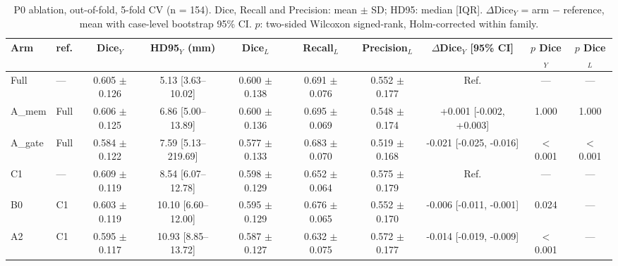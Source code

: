 \begin{table}[t]
\centering\small
\caption{P0 ablation, out-of-fold, 5-fold CV (n = 154). Dice, Recall and Precision: mean $\pm$ SD; HD95: median [IQR]. $\Delta$Dice$_Y$ = arm $-$ reference, mean with case-level bootstrap 95\% CI. $p$: two-sided Wilcoxon signed-rank, Holm-corrected within family.}
\label{tab:p0}
\begin{tabular}{llcccccccc}
\toprule
Arm & ref. & Dice$_Y$ & HD95$_Y$ (mm) & Dice$_L$ & Recall$_L$ & Precision$_L$ & $\Delta$Dice$_Y$ [95\% CI] & $p$ Dice$_Y$ & $p$ Dice$_L$ \\
\midrule
Full & — & 0.605 $\pm$ 0.126 & 5.13 [3.63–10.02] & 0.600 $\pm$ 0.138 & 0.691 $\pm$ 0.076 & 0.552 $\pm$ 0.177 & Ref. & — & — \\
A\_mem & Full & 0.606 $\pm$ 0.125 & 6.86 [5.00–13.89] & 0.600 $\pm$ 0.136 & 0.695 $\pm$ 0.069 & 0.548 $\pm$ 0.174 & +0.001 [-0.002, +0.003] & 1.000 & 1.000 \\
A\_gate & Full & 0.584 $\pm$ 0.122 & 7.59 [5.13–219.69] & 0.577 $\pm$ 0.133 & 0.683 $\pm$ 0.070 & 0.519 $\pm$ 0.168 & -0.021 [-0.025, -0.016] & $<$0.001 & $<$0.001 \\
C1 & — & 0.609 $\pm$ 0.119 & 8.54 [6.07–12.78] & 0.598 $\pm$ 0.129 & 0.652 $\pm$ 0.064 & 0.575 $\pm$ 0.179 & Ref. & — & — \\
B0 & C1 & 0.603 $\pm$ 0.119 & 10.10 [6.60–12.00] & 0.595 $\pm$ 0.129 & 0.676 $\pm$ 0.065 & 0.552 $\pm$ 0.170 & -0.006 [-0.011, -0.001] & 0.024 & — \\
A2 & C1 & 0.595 $\pm$ 0.117 & 10.93 [8.85–13.72] & 0.587 $\pm$ 0.127 & 0.632 $\pm$ 0.075 & 0.572 $\pm$ 0.177 & -0.014 [-0.019, -0.009] & $<$0.001 & — \\
\bottomrule
\end{tabular}
\end{table}
